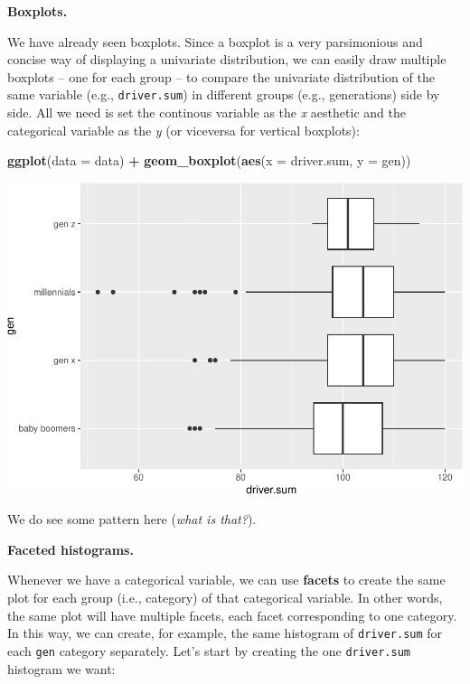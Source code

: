 \documentclass[
]{book}
\newenvironment{Shaded}{\begin{snugshade}}{\end{snugshade}}
\newcommand{\AttributeTok}[1]{\textcolor[rgb]{0.13,0.29,0.53}{#1}}
\newcommand{\FunctionTok}[1]{\textcolor[rgb]{0.13,0.29,0.53}{\textbf{#1}}}
\newcommand{\NormalTok}[1]{#1}
\newcommand{\SpecialCharTok}[1]{\textcolor[rgb]{0.81,0.36,0.00}{\textbf{#1}}}
\begin{document}
\textbf{Boxplots.}

We have already seen boxplots. Since a boxplot is a very parsimonious and concise way of displaying a univariate distribution, we can easily draw multiple boxplots -- one for each group -- to compare the univariate distribution of the same variable (e.g., \texttt{driver.sum}) in different groups (e.g., generations) side by side. All we need is set the continous variable as the \emph{x} aesthetic and the categorical variable as the \emph{y} (or viceversa for vertical boxplots):

\begin{Shaded}
\begin{Highlighting}[]
\FunctionTok{ggplot}\NormalTok{(}\AttributeTok{data =}\NormalTok{ data) }\SpecialCharTok{+}
  \FunctionTok{geom\_boxplot}\NormalTok{(}\FunctionTok{aes}\NormalTok{(}\AttributeTok{x =}\NormalTok{ driver.sum, }\AttributeTok{y =}\NormalTok{ gen))}
\end{Highlighting}
\end{Shaded}

\includegraphics{R-for-social-research-and-business-analytics_files/figure-latex/unnamed-chunk-41-1.pdf}

We do see some pattern here (\emph{what is that?}).

\textbf{Faceted histograms.}

Whenever we have a categorical variable, we can use \textbf{facets} to create the same plot for each group (i.e., category) of that categorical variable. In other words, the same plot will have multiple facets, each facet corresponding to one category. In this way, we can create, for example, the same histogram of \texttt{driver.sum} for each \texttt{gen} category separately. Let's start by creating the one \texttt{driver.sum} histogram we want:
\end{document}
